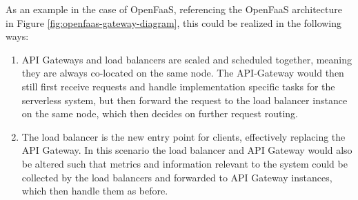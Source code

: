 As an example in the case of OpenFaaS, referencing the OpenFaaS architecture in Figure \ref{fig:openfaas-gateway-diagram}, this could be realized in the following ways:
\begin{enumerate}
    \item API Gateways and load balancers are scaled and scheduled together, meaning they are always co-located on the same node. The API-Gateway would then still first receive requests and handle implementation specific tasks for the serverless system, but then forward the request to the load balancer instance on the same node, which then decides on further request routing.
    \item The load balancer is the new entry point for clients, effectively replacing the API Gateway. In this scenario the load balancer and API Gateway would also be altered such that metrics and information relevant to the system could be collected by the load balancers and forwarded to API Gateway instances, which then handle them as before.
\end{enumerate}